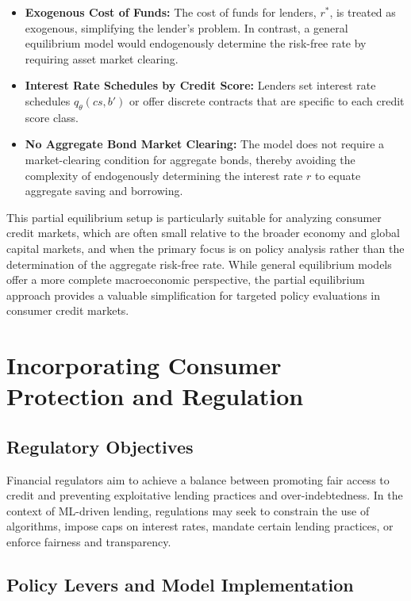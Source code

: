 \documentclass[acmsmall]{acmart}
\begin{document}
\begin{itemize}
    \item \textbf{Exogenous Cost of Funds:} The cost of funds for lenders, $r^*$, is treated as exogenous, simplifying the lender's problem. In contrast, a general equilibrium model would endogenously determine the risk-free rate by requiring asset market clearing.
    \item \textbf{Interest Rate Schedules by Credit Score:} Lenders set interest rate schedules $q_\theta(cs,b')$ or offer discrete contracts that are specific to each credit score class.
    \item \textbf{No Aggregate Bond Market Clearing:} The model does not require a market-clearing condition for aggregate bonds, thereby avoiding the complexity of endogenously determining the interest rate $r$ to equate aggregate saving and borrowing.
\end{itemize}
This partial equilibrium setup is particularly suitable for analyzing consumer credit markets, which are often small relative to the broader economy and global capital markets, and when the primary focus is on policy analysis rather than the determination of the aggregate risk-free rate. While general equilibrium models offer a more complete macroeconomic perspective, the partial equilibrium approach provides a valuable simplification for targeted policy evaluations in consumer credit markets.

\section*{Incorporating Consumer Protection and Regulation}

\subsection*{Regulatory Objectives}

Financial regulators aim to achieve a balance between promoting fair access to credit and preventing exploitative lending practices and over-indebtedness. In the context of ML-driven lending, regulations may seek to constrain the use of algorithms, impose caps on interest rates, mandate certain lending practices, or enforce fairness and transparency.

\subsection*{Policy Levers and Model Implementation}
\end{document}
